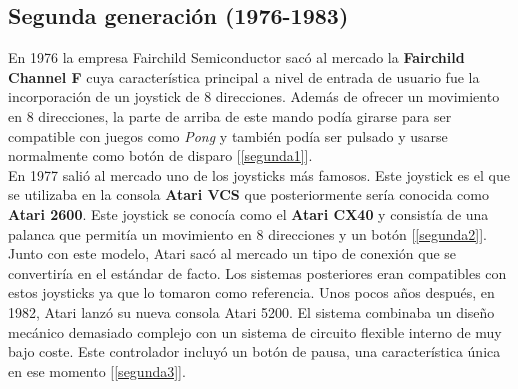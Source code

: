 \subsection{Segunda generaci\'on (1976-1983)}

En 1976 la empresa Fairchild Semiconductor sac\'o al mercado la \textbf{Fairchild Channel F} cuya caracter\'istica principal a nivel de entrada de usuario fue la incorporaci\'on de un joystick de 8 direcciones.  Adem\'as de ofrecer un movimiento en 8 direcciones, la parte de arriba de este mando pod\'ia girarse para ser compatible con juegos como \textit{Pong} y tambi\'en pod\'ia ser pulsado y usarse normalmente como bot\'on de disparo [\ref{segunda1}]. \\

En 1977 sali\'o al mercado uno de los joysticks m\'as famosos. Este joystick es el que se utilizaba en la consola \textbf{Atari VCS} que posteriormente ser\'ia conocida como \textbf{Atari 2600}. Este joystick se conoc\'ia como el \textbf{Atari CX40} y consist\'ia de una palanca que permit\'ia un movimiento en 8 direcciones y un bot\'on [\ref{segunda2}]. Junto con este modelo, Atari sac\'o al mercado un tipo de conexi\'on que se convertir\'ia en el est\'andar de facto. Los sistemas posteriores eran compatibles con estos joysticks ya que lo tomaron como referencia. Unos pocos a\~nos despu\'es, en 1982, Atari lanz\'o su nueva consola Atari 5200. El sistema combinaba un dise\~no mec\'anico demasiado complejo con un sistema de circuito flexible interno de muy bajo coste. Este controlador incluy\'o un bot\'on de pausa, una caracter\'istica \'unica en ese momento [\ref{segunda3}].\\

